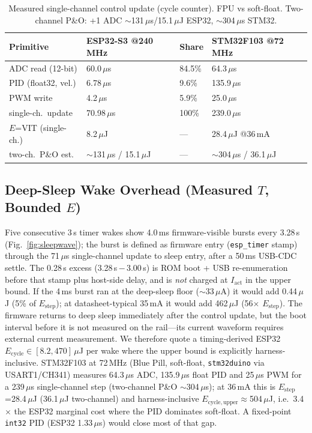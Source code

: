 \documentclass[10pt, conference, letterpaper]{IEEEtran}
\begin{document}
\begin{table}[t]
\centering
\caption{Measured single-channel control update (cycle counter). FPU vs soft-float. Two-channel P\&O: +1 ADC $\sim$131\,$\mu$s/15.1\,$\mu$J ESP32, $\sim$304\,$\mu$s STM32.}
\label{tab:timing}
{\scriptsize\setlength{\tabcolsep}{1.5pt}
\begin{tabular}{l l l l}
\toprule
Primitive & ESP32-S3 @240\,MHz & Share & STM32F103 @72\,MHz \\
\midrule
ADC read (12-bit) & 60.0\,$\mu$s & 84.5\% & 64.3\,$\mu$s \\
PID (float32, vel.) & 6.78\,$\mu$s & 9.6\% & 135.9\,$\mu$s \\
PWM write & 4.2\,$\mu$s & 5.9\% & 25.0\,$\mu$s \\
single-ch.\ update & 70.98\,$\mu$s & 100\% & 239.0\,$\mu$s \\
$E$=VIT (single-ch.) & 8.2\,$\mu$J & --- & 28.4\,$\mu$J @36\,mA \\
two-ch.\ P\&O est. & $\sim$131\,$\mu$s / 15.1\,$\mu$J & --- & $\sim$304\,$\mu$s / 36.1\,$\mu$J \\
\bottomrule
\end{tabular}}
\end{table}

\subsection{Deep-Sleep Wake Overhead (Measured $T$, Bounded $E$)}
\label{sec:wake}

Five consecutive 3\,s timer wakes show 4.0\,ms firmware-visible bursts every 3.28\,s (Fig.~\ref{fig:sleepwave}); the burst is defined as firmware entry (\texttt{esp\_timer} stamp) through the 71\,$\mu$s single-channel update to sleep entry, after a 50\,ms USB-CDC settle. The 0.28\,s excess (3.28\,s\,$-$\,3.00\,s) is ROM boot + USB re-enumeration before that stamp plus host-side delay, and is \emph{not} charged at $I_{\mathrm{act}}$ in the upper bound. If the 4\,ms burst ran at the deep-sleep floor ($\sim$33\,$\mu$A) it would add 0.44\,$\mu$J (5\% of $E_{\mathrm{step}}$); at datasheet-typical 35\,mA \cite{espressif_s3_datasheet} it would add 462\,$\mu$J (56$\times$ $E_{\mathrm{step}}$). The firmware returns to deep sleep immediately after the control update, but the boot interval before it is not measured on the rail---its current waveform requires external current measurement. We therefore quote a timing-derived ESP32 $E_{\mathrm{cycle}}\in[8.2,470]\,\mu$J per wake where the upper bound is explicitly harness-inclusive. STM32F103 at 72\,MHz (Blue Pill, soft-float, \texttt{stm32duino} via USART1/CH341) \cite{st_stm32f103} measures 64.3\,$\mu$s ADC, 135.9\,$\mu$s float PID and 25\,$\mu$s PWM for a 239\,$\mu$s single-channel step (two-channel P\&O $\sim$304\,$\mu$s); at 36\,mA this is $E_{\mathrm{step}}$=28.4\,$\mu$J (36.1\,$\mu$J two-channel) and harness-inclusive $E_{\mathrm{cycle,upper}}\approx$504\,$\mu$J, i.e.\ 3.4$\times$ the ESP32 marginal cost where the PID dominates soft-float. A fixed-point \texttt{int32} PID (ESP32 1.33\,$\mu$s) would close most of that gap.
\end{document}
